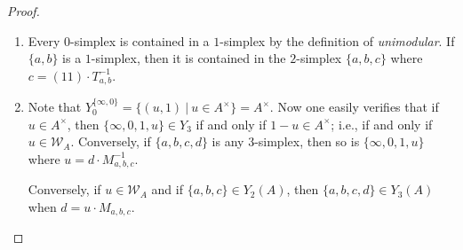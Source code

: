 \documentclass[12pt]{amsart}
\theoremstyle{definition}
\newtheorem{rem}[lem]{Remark}
\newcommand{\wn}[1]{\mathcal{W}_{#1}}%
\newcommand{\gl}[2]{\mathrm{GL}_{#1}(#2)}
\newcommand{\<}{\langle}
\renewcommand{\>}{\rangle}
\begin{document}
\begin{proof} 
\begin{enumerate}
\item Every $0$-simplex is contained in a $1$-simplex by the definition of \emph{unimodular}. If $\{a,b\}$ is a $1$-simplex, then it is contained in the $2$-simplex $\{ a,b,c\}$ where 
$c=(1 1)\cdot T_{a,b}^{-1}$. 
\item Note that $Y^{\{ \infty,0\}}_0=\{ (u,1)\ |\ u\in A^\times\}=A^\times$. Now one easily verifies that if $u\in A^\times$, then $\{ \infty,0,1,u\}\in Y_3$ if and only if $1-u\in A^\times$; i.e., 
if and only if $u\in \wn{A}$. Conversely, if $\{ a,b,c,d\}$ is any $3$-simplex, then so is $\{\infty,0,1,u\}$ where $u=d\cdot M_{a,b,c}^{-1}$. 

Conversely,  if $u\in \wn{A}$ and if $\{ a,b,c\}\in Y_2(A)$, then $\{a,b,c,d\}\in Y_3(A)$ when $d=u\cdot M_{a,b,c}$. 

\end{enumerate}
\end{proof}

\end{document}
